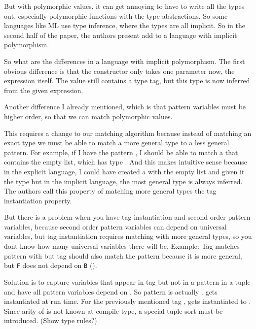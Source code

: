 \documentclass[12pt]{article}	%
\begin{document}
But with polymorphic values, it can get annoying to have to write all the types out, especially polymorphic functions with the type abstractions. So some languages like ML use type inference, where the types are all implicit. So in the second half of the paper, the authors present add \Dynamic to a language with implicit polymorphism.

So what are the differences in a language with implicit polymorphism. The first obvious difference is that the constructor only takes one parameter now, the expression itself. The \Dynamic value still contains a type tag, but this type is now inferred from the given expression.

Another difference I already mentioned, which is that pattern variables must be higher order, so that we can match polymorphic values.

This requires a change to our matching algorithm because instead of matching an exact type we must be able to match a more general type to a less general pattern. For example, if I have the pattern , I should be able to match a \Dynamic that contains the empty list, which has type . And this makes intuitive sense because in the explicit language, I could have created a \Dynamic with the empty list and given it the type  but in the implicit language, the most general type is always inferred. The authors call this property of matching more general types the tag instantiation property.

But there is a problem when you have tag instantiation and second order pattern variables, because second order pattern variables can depend on universal variables, but tag instantiation requires matching with more general types, so you dont know how many universal variables there will be. 
	Example:
	Tag  matches pattern  with  but tag  should also match the pattern because it is more general, but \texttt{F} does not depend on \texttt{B} ().
	
	Solution is to capture variables that appear in tag but not in a pattern in a tuple  and have all pattern variables depend on . So pattern  is actually  .  gets instantiated at run time. For the previously mentioned tag ,  gets instantiated to . Since arity of  is not known at compile type, a special tuple sort must be introduced. (Show type rules?)
	
\end{document}
